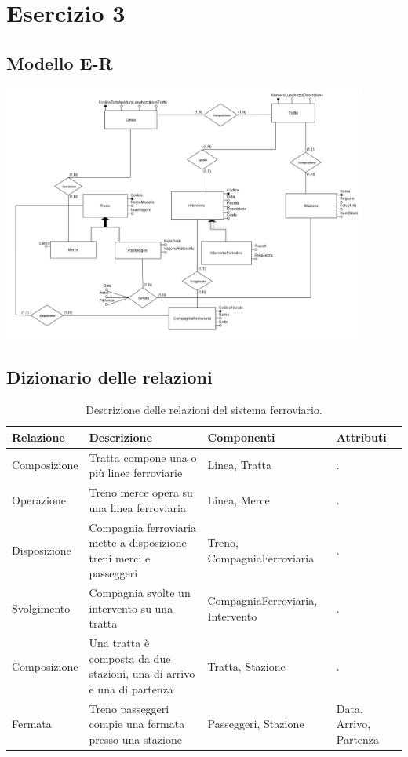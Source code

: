 \documentclass{article}
\begin{document}
\pagestyle{empty}

\section*{Esercizio 3} 

\subsection*{Modello E-R}
\includegraphics*[width=0.9\textwidth]{foto1.png}

\subsection*{Dizionario delle relazioni}

\begin{table}[ht]
    \centering
    \begin{tabularx}{\textwidth}{|X|X|X|X|}
        \hline
        Relazione & Descrizione & Componenti & Attributi \\
        \hline
        Composizione & Tratta compone una o più linee ferroviarie & Linea, Tratta & . \\
        \hline
        Operazione & Treno merce opera su una linea ferroviaria & Linea, Merce & . \\
        \hline
        Disposizione & Compagnia ferroviaria mette a disposizione treni merci e passeggeri & Treno, CompagniaFerroviaria & . \\
        \hline
        Svolgimento & Compagnia svolte un intervento su una tratta & CompagniaFerroviaria, Intervento & . \\
        \hline
        Composizione & Una tratta è composta da due stazioni, una di arrivo e una di partenza & Tratta, Stazione & . \\
        \hline
        Fermata & Treno passeggeri compie una fermata presso una stazione & Passeggeri, Stazione & Data, Arrivo, Partenza \\
        \hline
        
    \end{tabularx}
    \caption{Descrizione delle relazioni del sistema ferroviario.}
\end{table}
\end{document}
